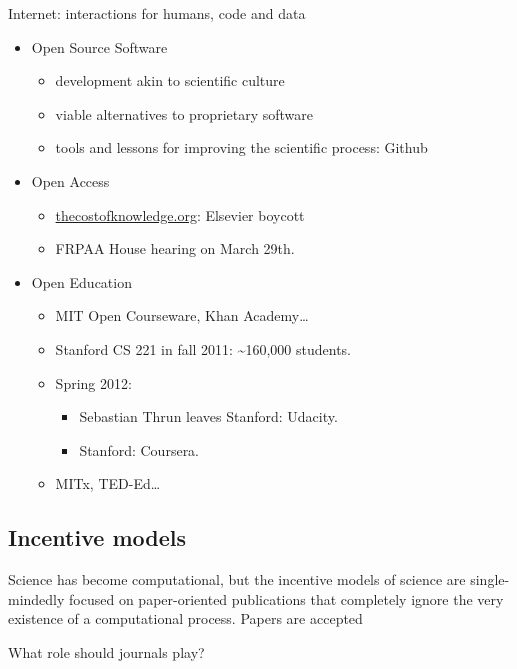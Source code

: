 \documentclass[ChapterTOCs,krantz2]{krantz} %
\begin{document}
Internet: interactions for humans, code and data

\begin{itemize}
\item Open Source Software

\begin{itemize}
\item development akin to scientific culture
\item viable alternatives to proprietary software
\item tools and lessons for improving the scientific process: Github
\end{itemize}

\item Open Access

\begin{itemize}
\item \url{thecostofknowledge.org}: Elsevier boycott
\item FRPAA House hearing on March 29th.
\end{itemize}

\item Open Education

\begin{itemize}
\item MIT Open Courseware, Khan Academy\ldots
\item Stanford CS 221 in fall 2011: \textasciitilde{}160,000 students.
\item Spring 2012:

\begin{itemize}
\item Sebastian Thrun leaves Stanford: Udacity.
\item Stanford: Coursera.
\end{itemize}
\item MITx, TED-Ed\ldots
\end{itemize}
\end{itemize}

\subsection{Incentive models}

Science has become computational, but the incentive models of science
are single-mindedly focused on paper-oriented publications that completely
ignore the very existence of a computational process. Papers are accepted 

What role should journals play?
\end{document}
